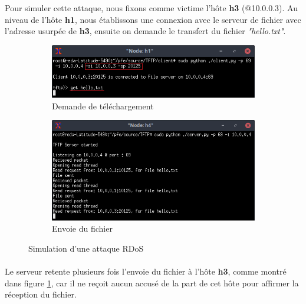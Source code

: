 Pour simuler cette attaque, nous fixons comme victime l'hôte \textbf{h3} (@10.0.0.3). Au niveau de l'hôte \textbf{h1}, nous établissons une connexion avec le serveur de fichier avec l'adresse usurpée de \textbf{h3}, ensuite on demande le transfert du fichier \textit{"hello.txt"}.
\begin{figure}[h]
\centering
\begin{subfigure}{12.5cm}
\centering
\includegraphics[width=\textwidth]{Figures/simulation/mininet/TFTP/client/attack}
\caption{Demande de téléchargement}
\end{subfigure}
\vskip 0.4cm
\begin{subfigure}{12.5cm}
\centering
\includegraphics[width=\textwidth]{Figures/simulation/mininet/TFTP/server/attack_request}
\caption{Envoie du fichier}
\label{fig:send}
\end{subfigure}
\vskip 0.3cm
\decoRule
\caption{Simulation d'une attaque RDoS}
\label{fig:c/s_TFTP}
\end{figure}
\paragraph{}
Le serveur retente plusieurs fois l'envoie du fichier à l'hôte \textbf{h3}, comme montré dans figure \ref{fig:send}, car il ne reçoit aucun accusé de la part de cet hôte pour affirmer la réception du fichier.\\


